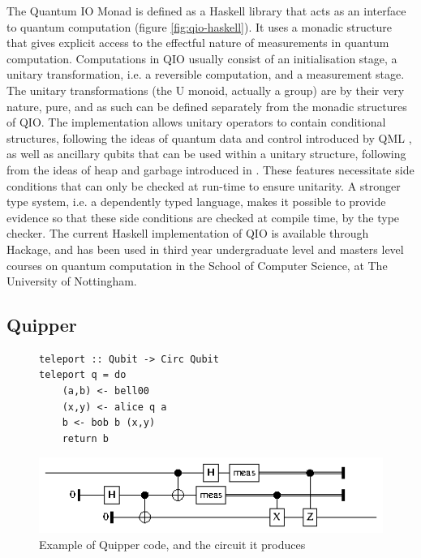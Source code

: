 \documentclass[a4paper]{article}
\begin{document}
The Quantum IO Monad  is defined as a
Haskell library that acts as an interface to quantum computation
(figure \ref{fig:qio-haskell}). It uses a monadic structure that gives
explicit access to the effectful nature of measurements in quantum
computation.  Computations in QIO usually consist of an initialisation
stage, a unitary transformation, i.e. a reversible computation, and a
measurement stage. The unitary transformations (the U monoid, actually
a group) are by their very nature, pure, and as such can be defined
separately from the monadic structures of QIO. The implementation
allows unitary operators to contain conditional structures, following
the ideas of quantum data and control introduced by QML
, as well as ancillary qubits that can be used
within a unitary structure, following from the ideas of heap and
garbage introduced in . These features
necessitate side conditions that can only be checked at run-time to
ensure unitarity.
A stronger type system, i.e. a dependently typed language, makes it
possible to provide evidence so that these side conditions are
checked at compile time, by the type checker. The current Haskell
implementation of QIO is available through Hackage,
and has been used in third year undergraduate level and masters level
courses on quantum computation in the School of Computer Science, at
The University of Nottingham.

\subsection*{Quipper}

\begin{figure}
\begin{verbatim}
teleport :: Qubit -> Circ Qubit
teleport q = do
    (a,b) <- bell00
    (x,y) <- alice q a
    b <- bob b (x,y)
    return b
\end{verbatim}
\includegraphics[width=\columnwidth]{teleport.eps}
\caption{Example of Quipper code, and the circuit it produces}\label{fig:quipper-circ}
\end{figure}
\end{document}
